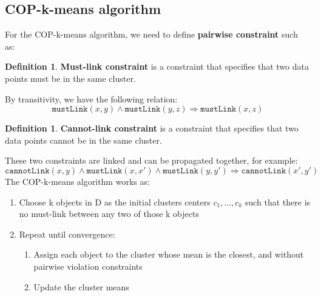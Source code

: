 \documentclass[12pt, openany]{report}
\theoremstyle{definition}
\newtheorem{definition}[thm]{Definition}
\begin{document}
\subsection{COP-k-means algorithm}
For the COP-k-means algorithm, we need to define \textbf{pairwise constraint} such as:
\begin{definition}
    \textbf{Must-link constraint} is a constraint that specifies that two data points must be in the same cluster.
\end{definition}
By transitivity, we have the following relation:
\begin{equation}
    \texttt{mustLink}(x,y) \wedge \texttt{mustLink}(y,z) \Rightarrow \texttt{mustLink}(x,z)
\end{equation}
\begin{definition}
    \textbf{Cannot-link constraint} is a constraint that specifies that two data points cannot be in the same cluster.
\end{definition}
These two constraints are linked and can be propagated together, for example:
\begin{equation}
    \texttt{cannotLink}(x,y) \wedge \texttt{mustLink}(x,x') \wedge \texttt{mustLink}(y,y') \Rightarrow \texttt{cannotLink}(x',y')
\end{equation}
The COP-k-means algorithm works as:
\begin{enumerate}
    \item Choose k objects in D as the initial clusters centers $c_1, \dots, c_k$ such that there is no must-link between any two of those k objects
    \item Repeat until convergence:
    \begin{enumerate}
        \item Assign each object to the cluster whose mean is the closest, and without pairwise violation constraints
        \item Update the cluster means
    \end{enumerate}
\end{enumerate}
\end{document}
